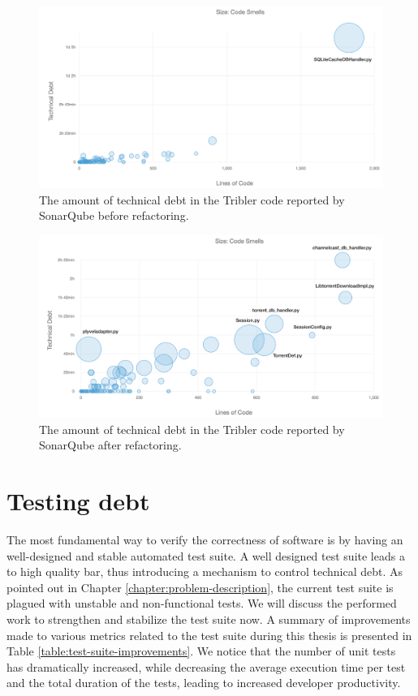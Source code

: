\begin{figure}[h!]
	\centering
	\includegraphics[width=1.0\columnwidth]{images/improving_qa/technical_debt_core_before}
	\caption{The amount of technical debt in the Tribler code reported by SonarQube before refactoring.}
	\label{fig:technical-debt-core-before}
\end{figure}

\begin{figure}[h!]
	\centering
	\includegraphics[width=1.0\columnwidth]{images/improving_qa/technical_debt_core_after}
	\caption{The amount of technical debt in the Tribler code reported by SonarQube after refactoring.}
	\label{fig:technical-debt-core-after}
\end{figure}

\section{Testing debt}
The most fundamental way to verify the correctness of software is by having an well-designed and stable automated test suite. A well designed test suite leads a to high quality bar, thus introducing a mechanism to control technical debt\cite{sumit2016unittests}. As pointed out in Chapter \ref{chapter:problem-description}, the current test suite is plagued with unstable and non-functional tests. We will discuss the performed work to strengthen and stabilize the test suite now. A summary of improvements made to various metrics related to the test suite during this thesis is presented in Table \ref{table:test-suite-improvements}. We notice that the number of unit tests has dramatically increased, while decreasing the average execution time per test and the total duration of the tests, leading to increased developer productivity.

